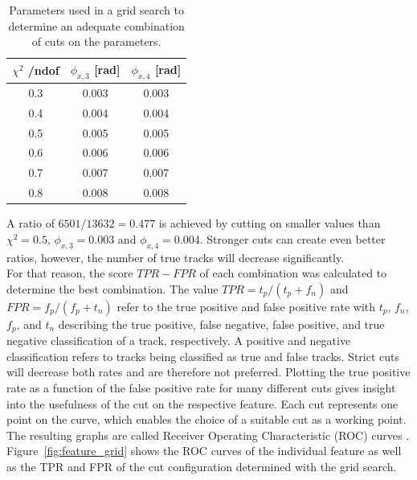 \begin{table}[H]
  \centering
  \caption{Parameters used in a grid search to determine an adequate combination of cuts on the parameters.}
  \begin{tabular}{c c c}
    \toprule
    $\chi^2$ /ndof & $\phi_{x,3}$ [rad] & $\phi_{x,4}$ [rad]\\
    \midrule
    0.3 & 0.003 & 0.003 \\
    0.4 & 0.004 & 0.004 \\
    0.5 & 0.005 & 0.005 \\
    0.6 & 0.006 & 0.006 \\
    0.7 & 0.007 & 0.007 \\
    0.8 & 0.008 & 0.008
  \end{tabular}
  \label{tab:params}
\end{table}

A ratio of $6501/13632 = 0.477$ is achieved by cutting on smaller values
than $\chi^2 = 0.5$, $\phi_{x,3} = 0.003$ and $\phi_{x,4}=0.004$.
Stronger cuts can create even better ratios, however, the number of true tracks will decrease significantly. \\
For that reason, the score $TPR-FPR$ of each combination
was calculated to determine the best combination. The value $TPR = t_p/(t_p + f_n)$ and $FPR = f_p/(f_p + t_n)$
refer to the true positive and false positive rate with
$t_p$, $f_n$, $f_p$, and $t_n$ describing the true positive, false negative, false positive, and true negative classification of a track, respectively.
A positive and negative classification refers to tracks being classified as true and false tracks.
Strict cuts will decrease both rates and are therefore not preferred. Plotting the
true positive rate as a function of the false positive rate for many different cuts gives insight into the usefulness of the cut on the respective feature. Each cut
represents one point on the curve, which enables the choice of a suitable cut as a working point.
The resulting
graphs are called Receiver Operating Characteristic (ROC) curves \cite{roc}.
\mbox{Figure \ref{fig:feature_grid}} shows the ROC curves of the individual feature as well as the TPR and FPR of the cut configuration determined with the grid search.

